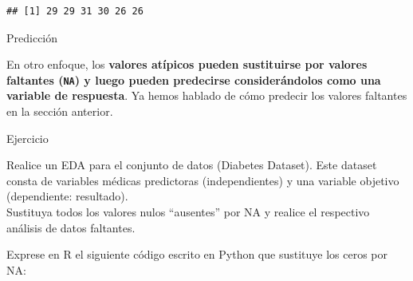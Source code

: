 \documentclass[
]{book}
\newenvironment{Shaded}{\begin{snugshade}}{\end{snugshade}}
\newcommand{\AttributeTok}[1]{\textcolor[rgb]{0.13,0.29,0.53}{#1}}
\newcommand{\CommentTok}[1]{\textcolor[rgb]{0.56,0.35,0.01}{\textit{#1}}}
\newcommand{\DecValTok}[1]{\textcolor[rgb]{0.00,0.00,0.81}{#1}}
\newcommand{\FloatTok}[1]{\textcolor[rgb]{0.00,0.00,0.81}{#1}}
\newcommand{\FunctionTok}[1]{\textcolor[rgb]{0.13,0.29,0.53}{\textbf{#1}}}
\newcommand{\NormalTok}[1]{#1}
\newcommand{\OtherTok}[1]{\textcolor[rgb]{0.56,0.35,0.01}{#1}}
\newcommand{\SpecialCharTok}[1]{\textcolor[rgb]{0.81,0.36,0.00}{\textbf{#1}}}
\begin{document}
\begin{Shaded}
\end{Shaded}

\begin{verbatim}
## [1] 29 29 31 30 26 26
\end{verbatim}

{} Predicción

En otro enfoque, los \textbf{valores atípicos pueden sustituirse por valores faltantes (\texttt{NA}) y luego pueden predecirse considerándolos como una variable de respuesta}. Ya hemos hablado de cómo predecir los valores faltantes en la sección anterior.

{} Ejercicio

Realice un EDA para el conjunto de datos
(Diabetes Dataset).
Este dataset consta de variables médicas predictoras (independientes) y una variable objetivo (dependiente: resultado).\\
Sustituya todos los valores nulos ``ausentes'' por NA y realice el respectivo análisis de datos faltantes.

Exprese en R el siguiente código escrito en Python que sustituye los ceros por NA:\\
\end{document}
